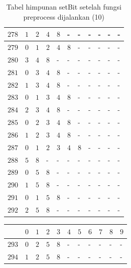 \begin{appendices}
\begin{table}[H]
\begin{tabular} {|l|l|l|l|l|l|l|l|l|l|l|}
  		$ 278 $ & $ 1 $ &$ 2 $ &$ 4 $ &$ 8 $ & - &  - &  - &  - &  - &  -   \\ \hline
  		$ 279 $ & $ 0 $ &$ 1 $ &$ 2 $ &$ 4 $ &$ 8 $ & - &  - &  - &  - &  -   \\ \hline
  		$ 280 $ & $ 3 $ &$ 4 $ &$ 8 $ & - &  - &  - &  - &  - &  - &  -   \\ \hline
  		$ 281 $ & $ 0 $ &$ 3 $ &$ 4 $ &$ 8 $ & - &  - &  - &  - &  - &  -   \\ \hline
  		$ 282 $ & $ 1 $ &$ 3 $ &$ 4 $ &$ 8 $ & - &  - &  - &  - &  - &  -   \\ \hline
  		$ 283 $ & $ 0 $ &$ 1 $ &$ 3 $ &$ 4 $ &$ 8 $ & - &  - &  - &  - &  -   \\ \hline
  		$ 284 $ & $ 2 $ &$ 3 $ &$ 4 $ &$ 8 $ & - &  - &  - &  - &  - &  -   \\ \hline
  		$ 285 $ & $ 0 $ &$ 2 $ &$ 3 $ &$ 4 $ &$ 8 $ & - &  - &  - &  - &  -   \\ \hline
  		$ 286 $ & $ 1 $ &$ 2 $ &$ 3 $ &$ 4 $ &$ 8 $ & - &  - &  - &  - &  -   \\ \hline
  		$ 287 $ & $ 0 $ &$ 1 $ &$ 2 $ &$ 3 $ &$ 4 $ &$ 8 $ & - &  - &  - &  -   \\ \hline
  		$ 288 $ & $ 5 $ &$ 8 $ & - &  - &  - &  - &  - &  - &  - &  -   \\ \hline
  		$ 289 $ & $ 0 $ &$ 5 $ &$ 8 $ & - &  - &  - &  - &  - &  - &  -   \\ \hline
  		$ 290 $ & $ 1 $ &$ 5 $ &$ 8 $ & - &  - &  - &  - &  - &  - &  -   \\ \hline
  		$ 291 $ & $ 0 $ &$ 1 $ &$ 5 $ &$ 8 $ & - &  - &  - &  - &  - &  -   \\ \hline
  		$ 292 $ & $ 2 $ &$ 5 $ &$ 8 $ & - &  - &  - &  - &  - &  - &  -   \\ \hline  		
  	\end{tabular}\caption{Tabel himpunan setBit setelah fungsi preprocess dijalankan (10)}
  	\label{tab:setbit_10}
  \end{table}
  \begin{table}[H]
  	\centering
  	\begin{tabular} {|l|l|l|l|l|l|l|l|l|l|l|} \hline
  		\backslashbox{$Num$}{$index$} & $ 0 $ & $ 1 $ & $ 2 $ & $ 3 $ & $ 4 $ & $ 5 $ & $ 6 $ & $ 7 $ & $ 8 $ & $ 9 $ \\ \hline
  		$ 293 $ & $ 0 $ &$ 2 $ &$ 5 $ &$ 8 $ & - &  - &  - &  - &  - &  -   \\ \hline
  		$ 294 $ & $ 1 $ &$ 2 $ &$ 5 $ &$ 8 $ & - &  - &  - &  - &  - &  -   \\ \hline

\end{tabular}
\end{table}
\end{appendices}
